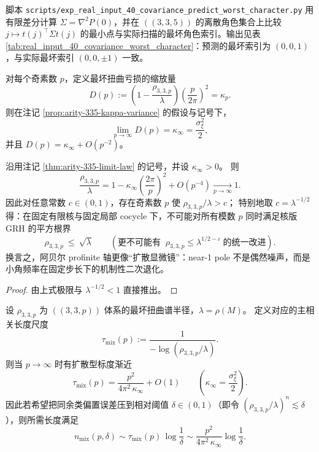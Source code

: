 \begin{remark}\label{rem:arity-335-worst-direction-cov-check}
脚本 \texttt{scripts/exp\_real\_input\_40\_covariance\_predict\_worst\_character.py} 用有限差分计算 \(\Sigma=\nabla^2P(0)\)，并在 \(((3,3,5))\) 的离散角色集合上比较
\(
j\mapsto t(j)^\top\Sigma t(j)
\)
的最小点与实际扫描的最坏角色索引。输出见表 \ref{tab:real_input_40_covariance_worst_character}：预测的最坏索引为 \((0,0,1)\)，与实际最坏索引 \((0,0,\pm1)\) 一致。
\end{remark}





\begin{remark}\label{thm:arity-335-limit-law}
对每个奇素数 \(p\)，定义最坏扭曲亏损的缩放量
$$
D(p)
:=
\left(1-\frac{\rho_{3,3,p}}{\lambda}\right)\left(\frac{p}{2\pi}\right)^2
=\kappa_p.
$$
则在注记 \ref{prop:arity-335-kappa-variance} 的假设与记号下，
$$
\lim_{p\to\infty}D(p)=\kappa_\infty=\frac{\sigma_\xi^2}{2},
$$
并且 \(D(p)=\kappa_\infty+O(p^{-2})\)。
\end{remark}

\begin{corollary}\label{cor:arity-335-abelian-uniform-gap-nogo}
沿用注记 \ref{thm:arity-335-limit-law} 的记号，并设 \(\kappa_\infty>0\)。
则
\[
\frac{\rho_{3,3,p}}{\lambda}
=
1-\kappa_\infty\left(\frac{2\pi}{p}\right)^2+O(p^{-4})
\xrightarrow[p\to\infty]{}1.
\]
因此对任意常数 \(c\in(0,1)\)，存在奇素数 \(p\) 使 \(\rho_{3,3,p}/\lambda>c\)；
特别地取 \(c=\lambda^{-1/2}\) 得：在固定有限核与固定局部 cocycle 下，不可能对所有模数 \(p\) 同时满足核版 GRH 的平方根界
\[
\rho_{3,3,p}\ \le\ \sqrt{\lambda}
\qquad(\text{更不可能有 }\ \rho_{3,3,p}\le \lambda^{1/2-\varepsilon}\ \text{的统一改进}).
\]
换言之，阿贝尔 profinite 轴更像“扩散显微镜”：near-1 pole 不是偶然噪声，而是小角频率在固定步长下的机制性二次退化。
\end{corollary}
\begin{proof}
由上式极限与 \(\lambda^{-1/2}<1\) 直接推出。
\end{proof}

\begin{remark}\label{cor:arity-335-diffusive-mixing}
设 $\rho_{3,3,p}$ 为 $((3,3,p))$ 体系的最坏扭曲谱半径，$\lambda=\rho(M)$。
定义对应的主相关长度尺度
\[
\tau_{\mathrm{mix}}(p):=\frac{1}{-\log(\rho_{3,3,p}/\lambda)}.
\]
则当 $p\to\infty$ 时有扩散型标度渐近
\[
\tau_{\mathrm{mix}}(p)=\frac{p^2}{4\pi^2\,\kappa_\infty}+O(1)
\qquad\left(\kappa_\infty=\frac{\sigma_\xi^2}{2}\right).
\]
因此若希望把同余类偏置误差压到相对阈值 $\delta\in(0,1)$（即令 $(\rho_{3,3,p}/\lambda)^n\lesssim \delta$），则所需长度满足
\[
n_{\mathrm{mix}}(p,\delta)
\sim
\tau_{\mathrm{mix}}(p)\,\log\frac{1}{\delta}
\sim
\frac{p^2}{4\pi^2\,\kappa_\infty}\log\frac{1}{\delta}.
\]
\end{remark}

